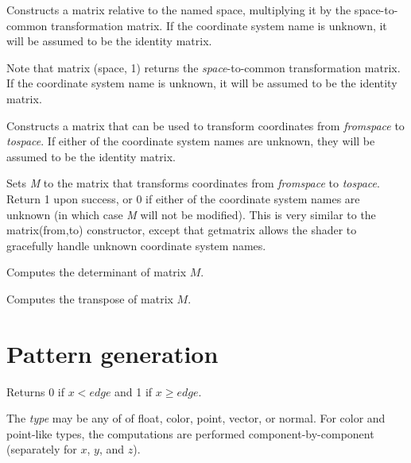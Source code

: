 \documentclass[11pt,letterpaper]{book}
\def\color{{\cf color}\xspace}
\def\float{{\cf float}\xspace}
\def\matrix{{\cf matrix}\xspace}
\def\normal{{\cf normal}\xspace}
\def\point{{\cf point}\xspace}
\def\vector{{\cf vector}\xspace}
\begin{document}
Constructs a \matrix relative to the named space, multiplying it by the
{\cf space}-to-{\cf common} transformation matrix.  If the coordinate
system name is unknown, it will be assumed to be the identity matrix.

Note that {\cf matrix (space, 1)} returns the 
\emph{space}-to-{\cf common} transformation matrix. If the coordinate
system name is unknown, it will be assumed to be the identity matrix.
\apiend

Constructs a \matrix that can be used to transform coordinates from
\emph{fromspace} to \emph{tospace}.  If either of the coordinate
system names are unknown, they will be assumed to be the identity matrix.
\apiend


Sets \emph{M} to the \matrix that transforms coordinates from
\emph{fromspace} to \emph{tospace}.  Return 1 upon success, or 0 if
either of the coordinate system names are unknown (in which case
\emph{M} will not be modified).  This is very similar to the
{\cf matrix(from,to)} constructor, except that {\cf getmatrix} allows
the shader to gracefully handle unknown coordinate system names.
\apiend

Computes the determinant of matrix $M$.
\apiend

Computes the transpose of matrix $M$.
\apiend



\section{Pattern generation}
\label{sec:stdlib:pattern}

Returns 0 if $x < {\mathit edge}$ and 1 if $x \ge {\mathit edge}$.

The \emph{type} may be any of of \float, \color, \point, \vector, or
\normal.  For \color and \point-like types, the computations are
performed component-by-component (separately for $x$, $y$, and $z$).
\apiend
\end{document}
